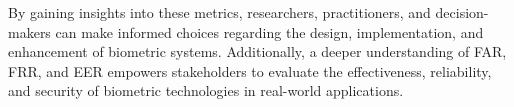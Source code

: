 By gaining insights into these metrics, researchers, practitioners, and decision-makers can make informed choices regarding the design, implementation, and enhancement of biometric systems. Additionally, a deeper understanding of FAR, FRR, and EER empowers stakeholders to evaluate the effectiveness, reliability, and security of biometric technologies in real-world applications.
